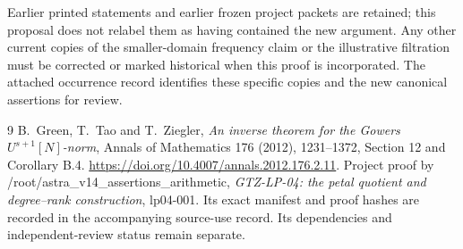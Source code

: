 \documentclass[11pt]{article}
\begin{document}
Earlier printed statements and earlier frozen project packets are retained;
this proposal does not relabel them as having contained the new argument.
Any other current copies of the smaller-domain frequency claim or the
illustrative filtration must be corrected or marked historical when this
proof is incorporated. The attached occurrence record identifies these
specific copies and the new canonical assertions for review.

\begin{thebibliography}{9}
 B.~Green, T.~Tao and T.~Ziegler,
\emph{An inverse theorem for the Gowers $U^{s+1}[N]$-norm},
Annals of Mathematics 176 (2012), 1231--1372,
Section 12 and Corollary B.4.
\url{https://doi.org/10.4007/annals.2012.176.2.11}.
 Project proof by /root/astra\_v14\_assertions\_arithmetic,
\emph{GTZ-LP-04: the petal quotient and degree--rank construction},
lp04-001. Its exact manifest and proof hashes are recorded in the
accompanying source-use record. Its dependencies and independent-review
status remain separate.
\end{thebibliography}
\end{document}
